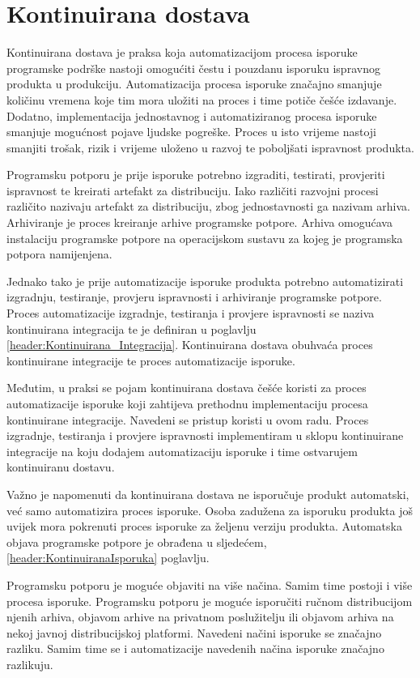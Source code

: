 \documentclass[times, utf8, diplomski, numeric]{fer}
\begin{document}
\chapter{Kontinuirana dostava}

Kontinuirana dostava je praksa koja automatizacijom procesa isporuke programske podrške nastoji omogućiti čestu i pouzdanu isporuku ispravnog produkta u produkciju. Automatizacija procesa isporuke značajno smanjuje količinu vremena koje tim mora uložiti na proces i time potiče češće izdavanje. Dodatno, implementacija jednostavnog i automatiziranog procesa isporuke smanjuje mogućnost pojave ljudske pogreške. Proces u isto vrijeme nastoji smanjiti trošak, rizik i vrijeme uloženo u razvoj te poboljšati ispravnost produkta\citep{wiki:ContinuousDelivery}.

Programsku potporu je prije isporuke potrebno izgraditi, testirati, provjeriti ispravnost te kreirati artefakt za distribuciju. Iako različiti razvojni procesi različito nazivaju artefakt za distribuciju, zbog jednostavnosti ga nazivam arhiva. Arhiviranje je proces kreiranje arhive programske potpore. Arhiva omogućava instalaciju programske potpore na operacijskom sustavu za kojeg je programska potpora namijenjena.

Jednako tako je prije automatizacije isporuke produkta potrebno automatizirati izgradnju, testiranje, provjeru ispravnosti i arhiviranje programske potpore. Proces automatizacije izgradnje, testiranja i provjere ispravnosti se naziva kontinuirana integracija te je definiran u poglavlju \ref{header:Kontinuirana_Integracija}. Kontinuirana dostava obuhvaća proces kontinuirane integracije te proces automatizacije isporuke.

Međutim, u praksi se pojam kontinuirana dostava češće koristi za proces automatizacije isporuke koji zahtijeva prethodnu implementaciju procesa kontinuirane integracije. Navedeni se pristup koristi u ovom radu. Proces izgradnje, testiranja i provjere ispravnosti implementiram u sklopu kontinuirane integracije na koju dodajem automatizaciju isporuke i time ostvarujem kontinuiranu dostavu.

Važno je napomenuti da kontinuirana dostava ne isporučuje produkt automatski, već samo automatizira proces isporuke. Osoba zadužena za isporuku produkta još uvijek mora pokrenuti proces isporuke za željenu verziju produkta. Automatska objava programske potpore je obrađena u sljedećem, \ref{header:KontinuiranaIsporuka} poglavlju.

Programsku potporu je moguće objaviti na više načina. Samim time postoji i više procesa isporuke. Programsku potporu je moguće isporučiti ručnom distribucijom njenih arhiva, objavom arhive na privatnom poslužitelju ili objavom arhiva na nekoj javnoj distribucijskoj platformi. Navedeni načini isporuke se značajno razliku. Samim time se i automatizacije navedenih načina isporuke značajno razlikuju.
\end{document}
